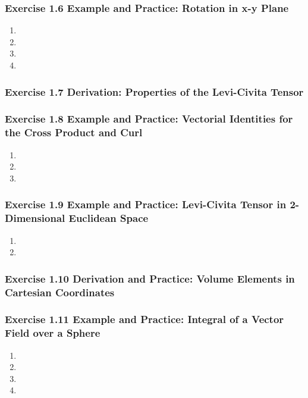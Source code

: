 \documentclass[10pt,a4paper]{book}
\theoremstyle{definition}
\begin{document}
\subsubsection{Exercise 1.6 Example and Practice: Rotation in x-y Plane}
\begin{enumerate}[label=(\alph*)]
\item
\item
\item
\item
\end{enumerate}

\subsubsection{Exercise 1.7 Derivation: Properties of the Levi-Civita Tensor}

\subsubsection{Exercise 1.8 Example and Practice: Vectorial Identities for the Cross Product
and Curl}
\begin{enumerate}[label=(\alph*)]
\item
\item
\item
\end{enumerate}

\subsubsection{Exercise 1.9 Example and Practice: Levi-Civita Tensor in 2-Dimensional Euclidean Space}
\begin{enumerate}[label=(\alph*)]
\item
\item
\end{enumerate}

\subsubsection{Exercise 1.10 Derivation and Practice: Volume Elements in Cartesian Coordinates}

\subsubsection{Exercise 1.11 Example and Practice: Integral of a Vector Field over a Sphere}
\begin{enumerate}[label=(\alph*)]
\item
\item
\item
\item
\end{enumerate}
\end{document}
